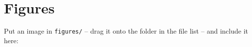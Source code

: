 \documentclass[11pt]{article}
\begin{document}
\section{Figures}

Put an image in \texttt{figures/} -- drag it onto the folder in the file
list -- and include it here:


\printbibliography
\end{document}
